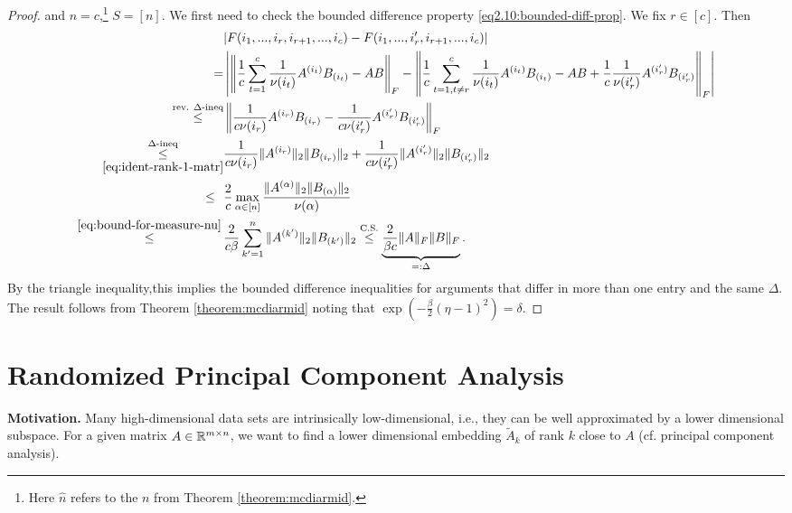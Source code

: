 \begin{theorem}
\begin{proof}
and $\hat{n}=c$,\footnote{Here $\hat{n}$ refers to the $n$ from Theorem \ref{theorem:mcdiarmid}.} $S=[n].$ We first need to check the bounded difference property \eqref{eq2.10:bounded-diff-prop}. We fix $r \in [c]$. Then
\begin{equation*}
\begin{split}
& |F(i_1,...,i_r,i_{r+1},...,i_c)-F(i_1,...,i_r',i_{r+1},...,i_c)|\\
= &\left|
\left\|
\frac{1}{c}
\sum_{t=1}^c \frac{1}{\nu(i_t)} A^{(i_t)} B_{(i_t)} - AB
\right\|_F - 
\left\|
\frac{1}{c}
\sum_{t=1, t\neq r}^c \frac{1}{\nu(i_t)} A^{(i_t)} B_{(i_t)} - AB +
\frac{1}{c} \frac{1}{\nu(i'_r)}A^{(i_r')}B_{(i'_r)}
\right\|_F
\right| \\
\overset{\text{rev. }\Delta\text{-ineq}}{\leq}
&
\left\|
\frac{1}{c\nu(i_r)} A^{(i_r)} B_{(i_r)} - \frac{1}{c\nu(i'_r)} A^{(i'_r)} B_{(i'_r)}
\right\|_F \\
\underset{\eqref{eq:ident-rank-1-matr}}{\overset{\Delta\text{-ineq}}{\leq}} &
\frac{1}{c\nu(i_r)} \|A^{(i_r)}\|_2 \|B_{(i_r)}\|_2 +  \frac{1}{c\nu(i'_r)} \|A^{(i'_r)}\|_2 \|B_{(i'_r)}\|_2 \\
\leq \ \ & \frac{2}{c} \max_{\alpha \in [n]}\frac{\|A^{(\alpha)}\|_2\|B_{(\alpha)}\|_2}{\nu(\alpha)} \\
\overset{\eqref{eq:bound-for-measure-nu}}{\leq} \, &
\frac{2}{c\beta} \sum_{k'=1}^n \|A^{(k')}\|_2 \|B_{(k')}\|_2 \overset{\text{C.S.}}\leq \underbrace{\frac{2}{\beta c}\|A\|_F \|B\|_F}_{=: \Delta}.
\end{split}
\end{equation*}
By the triangle inequality,this implies the bounded difference inequalities for arguments that differ in more than one entry and the same $\Delta$. The result follows from Theorem \ref{theorem:mcdiarmid} noting that $\exp(-\frac{\beta}{2}(\eta-1)^2)=\delta$.
\end{proof}
\end{theorem}
\section{Randomized Principal Component Analysis}
\textbf{Motivation.} Many high-dimensional data sets are intrinsically low-dimensional, i.e., they can be well approximated by a lower dimensional subspace. For a given matrix $A\in\mathbb{R}^{m \times n}$, we want to find a lower dimensional embedding $\tilde{A}_k$ of rank $k$ close to $A$ (cf. principal component analysis). 

